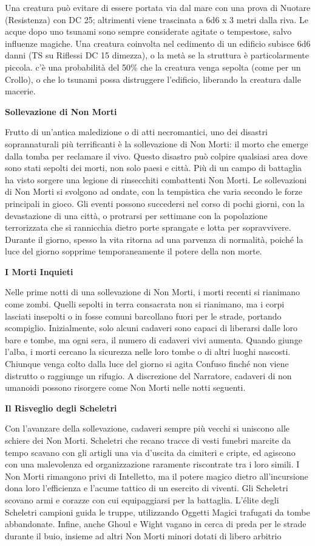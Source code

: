 \documentclass[a4paper,11pt,twoside,openany]{book}
\begin{document}
Una creatura può evitare di essere portata via dal mare con una prova di Nuotare (Resistenza) con DC 25; altrimenti viene trascinata a 6d6 x 3 metri dalla riva. Le acque dopo uno tsunami sono sempre considerate agitate o tempestose, salvo influenze magiche. Una creatura coinvolta nel cedimento di un edificio subisce 6d6 danni (TS su Riflessi DC 15 dimezza), o la metà se la struttura è particolarmente piccola. c'è una probabilità del 50\% che la creatura venga sepolta (come per un Crollo), o che lo tsunami possa distruggere l'edificio, liberando la creatura dalle macerie.

\textbf{Sollevazione di Non Morti}

Frutto di un'antica maledizione o di atti necromantici, uno dei disastri soprannaturali più terrificanti è la sollevazione di Non Morti: il morto che emerge dal­la tomba per reclamare il vivo. Questo disastro può colpire qualsiasi area dove sono stati sepolti dei morti, non solo paesi e città. Più di un campo di battaglia ha visto sorgere una legione di rinsecchiti combattenti Non Morti. Le sollevazioni di Non Morti si svolgono ad ondate, con la tempistica che varia secondo le forze principali in gioco. Gli eventi possono succedersi nel corso di pochi giorni, con la devastazione di una città, o protrarsi per settimane con la popolazione terrorizzata che si rannicchia dietro porte sprangate e lotta per sopravvivere. Durante il giorno, spesso la vita ritorna ad una parvenza di normalità, poiché la luce del giorno sopprime temporaneamente il potere della non morte.

\textbf{I Morti Inquieti}

Nelle prime notti di una sollevazione di Non Morti, i morti recenti si rianimano come zombi. Quelli sepolti in terra consacrata non si rianimano, ma i corpi lasciati insepolti o in fosse comuni barcollano fuori per le strade, portando scompiglio. Inizialmente, solo alcuni cadaveri sono capaci di liberarsi dal­le loro bare e tombe, ma ogni sera, il numero di cadaveri vivi aumenta. Quando giunge l'alba, i morti cercano la sicurezza nelle loro tombe o di altri luoghi nascosti. Chiunque venga colto dalla luce del giorno si agita Confuso finché non viene distrutto o raggiunge un rifugio. A discrezione del Narratore, cadaveri di non umanoidi possono risorgere come Non Morti nelle notti seguenti.

\textbf{Il Risveglio degli Scheletri}

Con l'avanzare della sollevazione, cadaveri sempre più vecchi si uniscono alle schiere dei Non Morti. Scheletri che recano tracce di vesti funebri marcite da tempo scavano con gli artigli una via d'uscita da cimiteri e cripte, ed agiscono con una malevolenza ed organizzazione raramente riscontrate tra i loro simili. I Non Morti rimangono privi di Intelletto, ma il potere magico dietro all'incursione dona loro l'efficienza e l'acume tattico di un esercito di viventi. Gli Scheletri scovano armi e corazze con cui equipaggiarsi per la battaglia. L'élite degli Scheletri campioni guida le truppe, utilizzando Oggetti Magici trafugati da tombe abbandonate. Infine, anche Ghoul e Wight vagano in cerca di preda per le strade durante il buio, insieme ad altri Non Morti minori dotati di libero arbitrio
\end{document}
